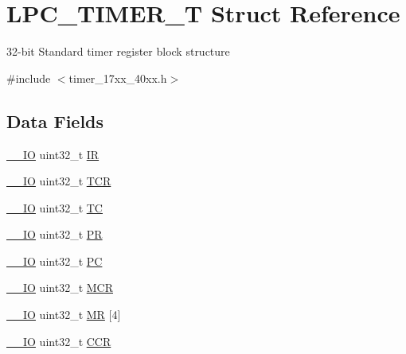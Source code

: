 \hypertarget{structLPC__TIMER__T}{\section{L\-P\-C\-\_\-\-T\-I\-M\-E\-R\-\_\-\-T Struct Reference}
\label{structLPC__TIMER__T}
}


32-\/bit Standard timer register block structure  




{\ttfamily \#include $<$timer\-\_\-17xx\-\_\-40xx.\-h$>$}

\subsection*{Data Fields}
\begin{DoxyCompactItemize}
\item 
\hyperlink{core__cm3_8h_aec43007d9998a0a0e01faede4133d6be}{\-\_\-\-\_\-\-I\-O} uint32\-\_\-t \hyperlink{structLPC__TIMER__T_a3db61fe5ab56aeea0c27c6199da63b1a}{I\-R}
\item 
\hyperlink{core__cm3_8h_aec43007d9998a0a0e01faede4133d6be}{\-\_\-\-\_\-\-I\-O} uint32\-\_\-t \hyperlink{structLPC__TIMER__T_ab6f7507a9fa9ac19e6ffb35f766027bb}{T\-C\-R}
\item 
\hyperlink{core__cm3_8h_aec43007d9998a0a0e01faede4133d6be}{\-\_\-\-\_\-\-I\-O} uint32\-\_\-t \hyperlink{structLPC__TIMER__T_ac92507831988bc15ddc0fbc30ab31bf9}{T\-C}
\item 
\hyperlink{core__cm3_8h_aec43007d9998a0a0e01faede4133d6be}{\-\_\-\-\_\-\-I\-O} uint32\-\_\-t \hyperlink{structLPC__TIMER__T_ab803475dcfb9c751b2b8d02f02cb9d95}{P\-R}
\item 
\hyperlink{core__cm3_8h_aec43007d9998a0a0e01faede4133d6be}{\-\_\-\-\_\-\-I\-O} uint32\-\_\-t \hyperlink{structLPC__TIMER__T_aff47df94f3c3f882c742af874983ffb9}{P\-C}
\item 
\hyperlink{core__cm3_8h_aec43007d9998a0a0e01faede4133d6be}{\-\_\-\-\_\-\-I\-O} uint32\-\_\-t \hyperlink{structLPC__TIMER__T_a7696d9896a932a78d6a6a60488332674}{M\-C\-R}
\item 
\hyperlink{core__cm3_8h_aec43007d9998a0a0e01faede4133d6be}{\-\_\-\-\_\-\-I\-O} uint32\-\_\-t \hyperlink{structLPC__TIMER__T_a26e8addd98189542175c5ecbcd8d3776}{M\-R} \mbox{[}4\mbox{]}
\item 
\hyperlink{core__cm3_8h_aec43007d9998a0a0e01faede4133d6be}{\-\_\-\-\_\-\-I\-O} uint32\-\_\-t \hyperlink{structLPC__TIMER__T_ae97a68e845ea92e8c617bbdf1d867e48}{C\-C\-R}

\end{DoxyCompactItemize}
